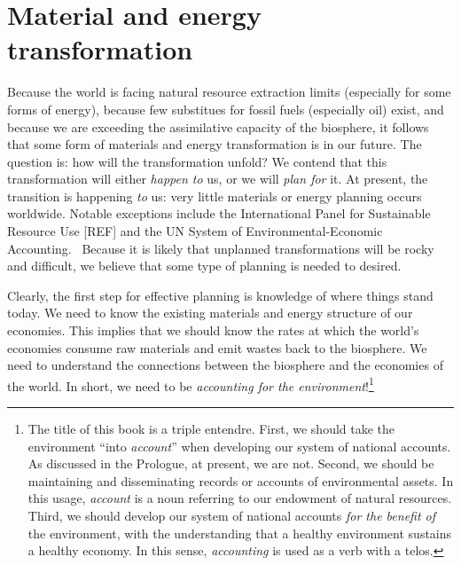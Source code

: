 \section{Material and energy transformation}

Because the world is facing natural resource extraction limits
(especially for some forms of energy), 
because few substitues for fossil fuels (especially oil) exist,
and because we are exceeding the assimilative capacity of the biosphere,
it follows that some form of materials and energy transformation is in our future.
The question is: how will the transformation unfold?
We contend that this transformation will either  
\emph{happen to} us, or we will \emph{plan for} it.
At present, %
the transition is happening \emph{to} us:
very little materials or energy planning occurs worldwide.
Notable exceptions include the International Panel for Sustainable Resource Use [REF]
and the UN System of Environmental-Economic Accounting.~\cite{UNSEEA:aa}
Because it is likely that unplanned transformations will be rocky and difficult,
we believe that some type of planning is needed to desired.

Clearly, the first step for effective planning 
is knowledge of where things stand today.
We need to know the existing materials and energy structure of our economies. 
This implies that we should know the rates at which 
the world's economies consume raw materials and emit wastes back to the biosphere.
We need to understand the connections between the biosphere and the economies of the world.
In short, we need to be \emph{accounting for the environment}!\footnote{The title 
	of this book is a triple entendre.
	First, we should take the environment ``into \emph{account}''
		when developing our system of national accounts.
		As discussed in the Prologue, at present, we are not.
	Second, we should be maintaining and disseminating
		records or accounts of environmental assets. 
		In this usage, \emph{account} is a noun
		referring to our endowment of natural resources.
	Third, we should develop our system of national accounts 
		\emph{for the benefit of} the environment, 
		with the understanding 
		that a healthy environment sustains a healthy economy.
		In this sense, \emph{accounting} is used as a verb with a telos.}

